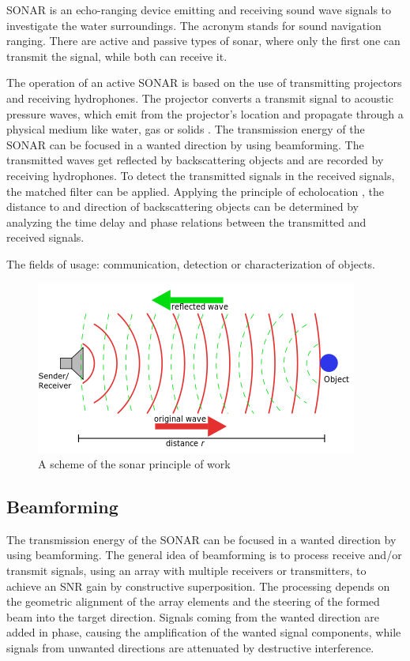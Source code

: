 \documentclass[11pt]{article}
\begin{document}
	SONAR is an echo-ranging device emitting and receiving sound wave signals to investigate the water surroundings. The acronym stands for sound navigation ranging. There are active and passive types of sonar, where only the first one can transmit the signal, while both can receive it.
	
	The operation of an active SONAR is based on the use of transmitting projectors and receiving hydrophones. The projector converts a transmit signal to acoustic pressure waves, which emit from the projector's location and propagate through a physical medium like water, gas or solids \cite{hodges_underwater_2011}. The transmission energy of the SONAR can be focused in a wanted direction by using beamforming. The transmitted waves get reflected by backscattering objects and are recorded by receiving hydrophones. To detect the transmitted signals in the received signals, the matched filter can be applied. Applying the principle of echolocation \cite{ainslie_principles_2010}, the distance to and direction of backscattering objects can be determined by analyzing the time delay and phase relations between the transmitted and received signals.
	
	The fields of usage: communication, detection or characterization of objects.
	
	\begin{figure} [H][htbp] %
	   \centering
	   \includegraphics[width=0.6\linewidth]{figures/sonar_scheme.png} 
	   \caption{A scheme of the sonar principle of work}
	   \label{fig:sonar_scheme}
	\end{figure}
	
\subsection{Beamforming}
	The transmission energy of the SONAR can be focused in a wanted direction by using beamforming. The general idea of beamforming is to process receive and/or transmit signals, using an array with multiple receivers or transmitters, to achieve an SNR gain by constructive superposition. The processing depends on the geometric alignment of the array elements and the steering of the formed beam into the target direction. Signals coming from the wanted direction are added in phase, causing the amplification of the wanted signal components, while signals from unwanted directions are attenuated by destructive interference.
\end{document}
